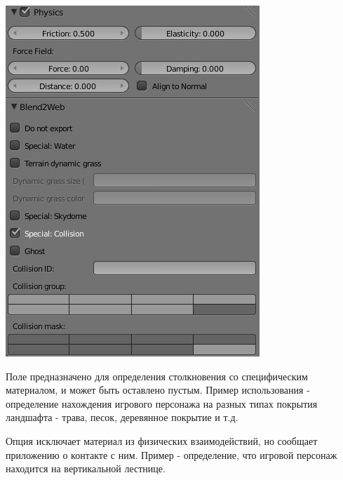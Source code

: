 \documentclass[a4paper,12pt,oneside]{sphinxmanual}
\begin{document}
\includegraphics[width=1.000\linewidth]{material_panel_physics.jpg}

\begin{DUlineblock}{0em}
\item[] 
\end{DUlineblock}

Поле  предназначено для определения столкновения со специфическим материалом, и может быть оставлено пустым. Пример использования  - определение нахождения игрового персонажа на разных типах покрытия ландшафта - трава, песок, деревянное покрытие и т.д.

Опция  исключает материал из физических взаимодействий, но сообщает приложению о контакте с ним. Пример - определение, что игровой персонаж находится на вертикальной лестнице.
\end{document}
